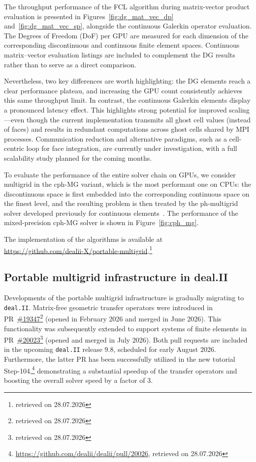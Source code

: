 \documentclass[a4paper,12pt]{article}
\begin{document}
The throughput performance of the FCL algorithm during matrix-vector product evaluation is presented in Figures~\ref{fig:dg_mat_vec_dp} and~\ref{fig:dg_mat_vec_sp}, alongside the continuous Galerkin operator evaluation. The Degrees of Freedom (DoF) per GPU are measured for each dimension of the corresponding discontinuous and continuous finite element spaces. Continuous matrix–vector evaluation listings are included to complement the DG results rather than to serve as a direct comparison.

Nevertheless, two key differences are worth highlighting: the DG elements reach a clear performance plateau, and increasing the GPU count consistently achieves this same throughput limit. In contrast, the continuous Galerkin elements display a pronounced latency effect. This highlights strong potential for improved scaling—even though the current implementation transmits all ghost cell values (instead of faces) and results in redundant computations across ghost cells shared by MPI processes. Communication reduction and alternative paradigms, such as a cell-centric loop for face integration, are currently under investigation, with a full scalability study planned for the coming months.



To evaluate the performance of the entire solver chain on GPUs, we consider multigrid in the cph-MG variant, which is the most performant one on CPUs: the discontinuous space is first embedded into the corresponding continuous space on the finest level, and the resulting problem is then treated by the ph-multigrid solver developed previously for continuous elements~\citep{Fehn2020}. The performance of the mixed-precision cph-MG solver is shown in Figure~\ref{fig:cph_mg}.

The implementation of the algorithms is available at \\ \url{https://github.com/dealii-X/portable-multigrid}.\footnote{retrieved on 28.07.2026}

\subsection{Portable multigrid infrastructure in deal.II}

Developments of the portable multigrid infrastructure is gradually migrating to \texttt{deal.II}. Matrix-free geometric transfer operators were introduced in PR~\href{https://github.com/dealii/dealii/pull/19347}{\#19347}\footnote{retrieved on 28.07.2026} (opened in February 2026 and merged in June 2026). This functionality was subsequently extended to support systems of finite elements in PR~\href{https://github.com/dealii/dealii/pull/20023}{\#20023}\footnote{retrieved on 28.07.2026} (opened and merged in July 2026). Both pull requests are included in the upcoming \texttt{deal.II} release 9.8, scheduled for early August 2026. Furthermore, the latter PR has been successfully utilized in the new tutorial Step-104,\footnote{\url{https://github.com/dealii/dealii/pull/20026}, retrieved on 28.07.2026} demonstrating a substantial speedup of the transfer operators and boosting the overall solver speed by a factor of 3.
\end{document}
